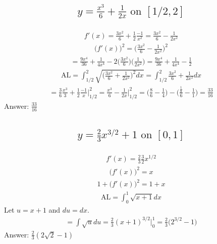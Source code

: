 \documentclass{article}
\begin{document}
\subsection{
	\begin{align*}
		y = \frac{x^3}{6} + \frac{1}{2x} \text{ on } [1/2, 2]
	\end{align*}
}
\begin{align*}
	f'(x) = \frac{3x^2}{6} + \frac{1}{2}\frac{-1}{x^2} = \frac{3x^2}{6} - \frac{1}{2x^2}
\end{align*}
\begin{align*}
	\bigg( f'(x) \bigg)^2 = \bigg( \frac{3x^2}{6} - \frac{1}{2x^2} \bigg)^2
\end{align*}
\begin{align*}
	= \frac{9x^4}{36} + \frac{1}{4x^4} - 2\bigg( \frac{3x^2}{6} \bigg) \bigg( \frac{1}{2x^2} \bigg) =  \frac{9x^4}{36} + \frac{1}{4x^4} - \frac{1}{2}
\end{align*}
\begin{align*}
	\text{AL} = \int_{1/2}^2 \sqrt{\bigg( \frac{3x^2}{6} + \frac{1}{2x^2} \bigg)^2 dx} = \int_{1/2}^2 {\frac{3x^2}{6} + \frac{1}{2x^2} dx}
\end{align*}
\begin{align*}
	= \frac{3}{6} \frac{x^3}{3} + \frac{1}{2} \frac{-1}{x} \bigg|_{1/2}^2 = \frac{x^3}{6} - \frac{1}{2x} \bigg|_{1/2}^2 = \bigg( \frac{8}{6} - \frac{1}{4} \bigg) - \bigg( \frac{\frac{1}{8}}{6} - \frac{1}{1} \bigg) = \frac{33}{16}
\end{align*}
Answer: $\frac{33}{16}$

\subsection{
	\begin{align*}
		y = \frac{2}{3} x^{3/2} + 1 \text{ on } [0, 1]
	\end{align*}
}
\begin{align*}
	f'(x) = \frac{2}{3} \frac{3}{2} x^{1/2}
\end{align*}
\begin{align*}
	\bigg( f'(x) \bigg)^2 = x
\end{align*}
\begin{align*}
	1 + \bigg( f'(x) \bigg)^2 = 1 + x
\end{align*}
\begin{align*}
	\text{AL} = \int_0^1{\sqrt{x + 1}dx}
\end{align*}
Let $u = x + 1$ and $du = dx$.
\begin{align*}
	= \int{\sqrt{u}du} = \frac{2}{3} (x + 1)^{3/2} \bigg|_0^1 = \frac{2}{3} \bigg( 2^{3/2} - 1 \bigg)
\end{align*}
Answer: $\frac{2}{3} (2\sqrt{2} - 1)$
\end{document}
